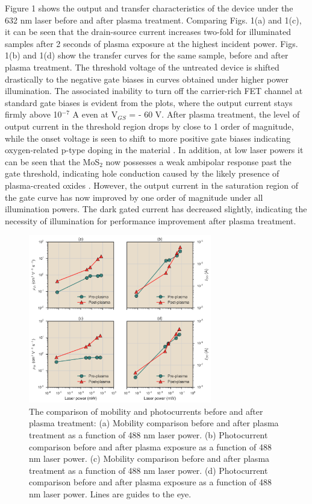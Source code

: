 \documentclass[%
 reprint,
superscriptaddress,
 amsmath,amssymb,
 aps,
prb,
]{revtex4-1}
\begin{document}
\indent Figure 1 shows the output and transfer characteristics of the device under the 632 nm laser before and after plasma treatment. Comparing Figs. 1(a) and 1(c), it can be seen that the drain-source current increases two-fold for illuminated samples after 2 seconds of plasma exposure at the highest incident power. Figs. 1(b) and 1(d) show the transfer curves for the same sample, before and after plasma treatment. The threshold voltage of the untreated device is shifted drastically to the negative gate biases in curves obtained under higher power illumination. The associated inability to turn off the carrier-rich FET channel at standard gate biases is evident from the plots, where the output current stays firmly above 10$^{-7}$ A even at V$_{GS}$ =  - 60 V. After plasma treatment, the level of output current in the threshold region drops by close to 1 order of magnitude, while the onset voltage is seen to shift to more positive gate biases indicating oxygen-related p-type doping in the material \cite{giannazzo2017ambipolar,guo2017observation}. In addition, at low laser powers it can be seen that the MoS$_2$ now possesses a weak ambipolar response past the gate threshold, indicating hole conduction caused by the likely presence of plasma-created oxides \cite{chuang2014mos2, mcdonnell2014hole}. However, the output current in the saturation region of the gate curve has now improved by one order of magnitude under all illumination powers. The dark gated current has decreased slightly, indicating the necessity of illumination for performance improvement after plasma treatment.
\begin{center}
\begin{figure}[!htb]
\includegraphics[width=80mm]{mobility}
\caption{The comparison of mobility and photocurrents before and after plasma treatment: (a) Mobility comparison before and after plasma treatment as a function of 488 nm laser power. (b) Photocurrent comparison before and after plasma exposure as a function of 488 nm laser power. (c) Mobility comparison before and after plasma treatment as a function of 488 nm laser power. (d) Photocurrent comparison before and after plasma exposure as a function of 488 nm laser power. Lines are guides to the eye.}
\end{figure}
\end{center}
\end{document}
